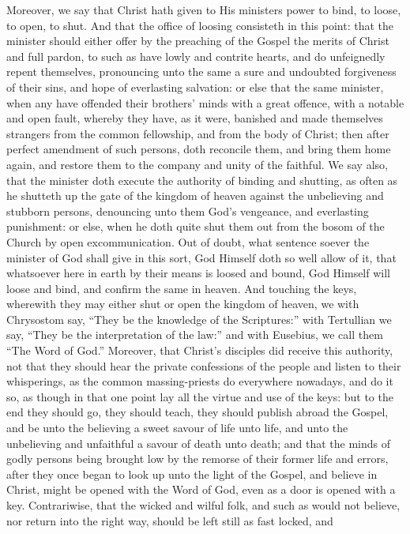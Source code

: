 Moreover, we say that Christ hath given to His ministers power to
bind, to loose, to open, to shut. And that the office of loosing
consisteth in this point: that the minister should either offer by the
preaching of the Gospel the merits of Christ and full pardon, to such
as have lowly and contrite hearts, and do unfeignedly repent themselves,
pronouncing unto the same a sure and undoubted forgiveness
of their sins, and hope of everlasting salvation: or else that the same
minister, when any have offended their brothers’ minds with a
great offence, with a notable and open fault, whereby they have, as
it were, banished and made themselves strangers from the common fellowship,
and from the body of Christ; then after perfect amendment of such persons,
doth reconcile them, and bring them home again, and restore them to
the company and unity of the faithful. We say also, that the minister
doth execute the authority of binding and shutting, as often as he shutteth
up the gate of the kingdom of heaven against the unbelieving and stubborn
persons, denouncing unto them God’s vengeance, and everlasting
punishment: or else, when he doth quite shut them out from the bosom
of the Church by open excommunication. Out of doubt, what sentence
soever the minister of God shall give in this sort, God Himself doth
so well allow of it, that whatsoever here in earth by their means is
loosed and bound, God Himself will loose and bind, and confirm the same
in heaven. And touching the keys, wherewith they may either shut
or open the kingdom of heaven, we with Chrysostom say, “They be
the knowledge of the Scriptures:” with Tertullian we say, “They
be the interpretation of the law:” and with Eusebius, we
call them “The Word of God.” Moreover, that Christ’s
disciples did receive this authority, not that they should hear the
private confessions of the people and listen to their whisperings, as
the common massing-priests do everywhere nowadays, and do it so, as
though in that one point lay all the virtue and use of the keys: but
to the end they should go, they should teach, they should publish abroad
the Gospel, and be unto the believing a sweet savour of life unto life,
and unto the unbelieving and unfaithful a savour of death unto death;
and that the minds of godly persons being brought low by the remorse
of their former life and errors, after they once began to look up unto
the light of the Gospel, and believe in Christ, might be opened with
the Word of God, even as a door is opened with a key. Contrariwise,
that the wicked and wilful folk, and such as would not believe, nor
return into the right way, should be left still as fast locked, and
